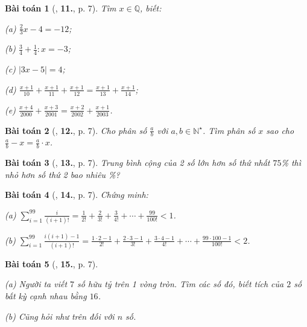 \documentclass{article}
\numberwithin{equation}{section}
\newtheorem{baitoan}{Bài toán}[section]
\begin{document}
\begin{baitoan}[\cite{Binh_Toan_7_tap_1}, \textbf{11.}, p. 7]
	Tìm $x\in\mathbb{Q}$, biết:
	\begin{enumerate*}
		\item[(a)] $\frac{2}{3}x - 4 = -12$;
		\item[(b)] $\frac{3}{4} + \frac{1}{4}:x = -3$;
		\item[(c)] $|3x - 5| = 4$;
		\item[(d)] $\frac{x + 1}{10} + \frac{x + 1}{11} + \frac{x + 1}{12} = \frac{x + 1}{13} + \frac{x + 1}{14}$;
		\item[(e)] $\frac{x + 4}{2000} + \frac{x + 3}{2001} = \frac{x + 2}{2002} + \frac{x + 1}{2003}$.
	\end{enumerate*}
\end{baitoan}

\begin{baitoan}[\cite{Binh_Toan_7_tap_1}, \textbf{12.}, p. 7]
	Cho phân số $\frac{a}{b}$ với $a,b\in\mathbb{N}^\star$. Tìm phân số $x$ sao cho $\frac{a}{b} - x = \frac{a}{b}\cdot x$.
\end{baitoan}

\begin{baitoan}[\cite{Binh_Toan_7_tap_1}, \textbf{13.}, p. 7]
	Trung bình cộng của 2 số lớn hơn số thứ nhất $75$\% thì nhỏ hơn số thứ 2 bao nhiêu \%?
\end{baitoan}

\begin{baitoan}[\cite{Binh_Toan_7_tap_1}, \textbf{14.}, p. 7]
	Chứng minh:\\	
	\begin{enumerate*}
		\item[(a)] $\sum_{i=1}^{99} \frac{i}{(i+1)!} = \frac{1}{2!} + \frac{2}{3!} + \frac{3}{4!} + \cdots + \frac{99}{100!} < 1$.
		\item[(b)] $\sum_{i=1}^{99} \frac{i(i + 1) - 1}{(i+1)!} = \frac{1\cdot 2 - 1}{2!} + \frac{2\cdot 3 - 1}{3!} + \frac{3\cdot 4 - 1}{4!} + \cdots + \frac{99\cdot 100 - 1}{100!} < 2$.
	\end{enumerate*}
\end{baitoan}

\begin{baitoan}[\cite{Binh_Toan_7_tap_1}, \textbf{15.}, p. 7]
	\begin{enumerate*}
		\item[(a)] Người ta viết $7$ số hữu tỷ trên 1 vòng tròn. Tìm các số đó, biết tích của $2$ số bất kỳ cạnh nhau bằng $16$.
		\item[(b)] Cũng hỏi như trên đối với $n$ số.
	\end{enumerate*}
\end{baitoan}
\end{document}
